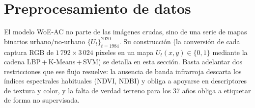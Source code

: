 \section{Preprocesamiento de datos}
\label{sec:preprocesamiento}

El modelo WoE-AC no parte de las imágenes crudas, sino de una serie de mapas binarios urbano/no-urbano $\{U_t\}_{t=1984}^{2020}$. Su construcción (la conversión de cada captura RGB de $1\,792 \times 3\,024$ píxeles en un mapa $U_t(x,y) \in \{0,1\}$ mediante la cadena LBP\,+\,K-Means\,+\,SVM) se detalla en esta sección. Basta adelantar dos restricciones que ese flujo resuelve: la ausencia de banda infrarroja descarta los índices espectrales habituales (NDVI, NDBI) y obliga a apoyarse en descriptores de textura y color, y la falta de verdad terreno para los 37 años obliga a etiquetar de forma no supervisada.

